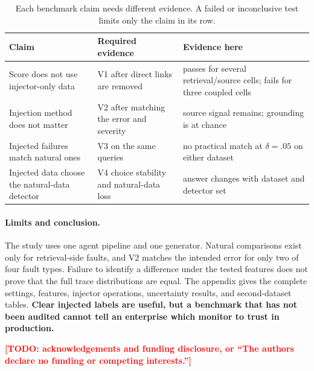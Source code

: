 \documentclass{article}
\newcommand{\TODO}[1]{\textcolor{red}{\textbf{[TODO: #1]}}}
\begin{document}
\begin{table}[t]
\centering\scriptsize
\caption{Each benchmark claim needs different evidence. A failed or inconclusive test limits
only the claim in its row.}
\begin{tabular}{@{}lp{4.1cm}p{4.1cm}@{}}
\toprule
Claim & Required evidence & Evidence here \\
\midrule
Score does not use injector-only data & V1 after direct links are removed & passes for several
retrieval/source cells; fails for three coupled cells \\
Injection method does not matter & V2 after matching the error and severity & source signal
remains; grounding is at chance \\
Injected failures match natural ones & V3 on the same queries & no practical match at
$\delta=.05$ on either dataset \\
Injected data choose the natural-data detector & V4 choice stability and natural-data loss &
answer changes with dataset and detector set \\
\bottomrule
\end{tabular}
\label{tab:claim-evidence-short}
\end{table}

\paragraph{Limits and conclusion.}
The study uses one agent pipeline and one generator. Natural comparisons exist only for
retrieval-side faults, and V2 matches the intended error for only two of four fault types.
Failure to identify a difference under the tested features does not prove that the full trace
distributions are equal. The appendix gives the complete settings, features, injector
operations, uncertainty results, and second-dataset tables. \textbf{Clear injected labels are useful, but a benchmark that has not been
audited cannot tell an enterprise which monitor to trust in production.}

\acksection
\TODO{acknowledgements and funding disclosure, or ``The authors declare no funding or competing interests.''}
\end{document}

